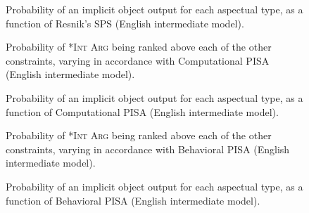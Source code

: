 \begin{figure}[!htb]
\caption{Probability of an implicit object output for each aspectual type, as a function of Resnik's SPS (English intermediate model).}
    
\end{figure}



\begin{figure}[!htb]
\caption{Probability of \textsc{*Int Arg} being ranked above each of the other constraints, varying in accordance with Computational PISA (English intermediate model).}
    
\end{figure}

\begin{figure}[!htb]
\caption{Probability of an implicit object output for each aspectual type, as a function of Computational PISA (English intermediate model).}
    
\end{figure}



\begin{figure}[!htb]
\caption{Probability of \textsc{*Int Arg} being ranked above each of the other constraints, varying in accordance with Behavioral PISA (English intermediate model).}
    
\end{figure}

\begin{figure}[!htb]
\caption{Probability of an implicit object output for each aspectual type, as a function of Behavioral PISA (English intermediate model).}
    
\end{figure}


\clearpage %

